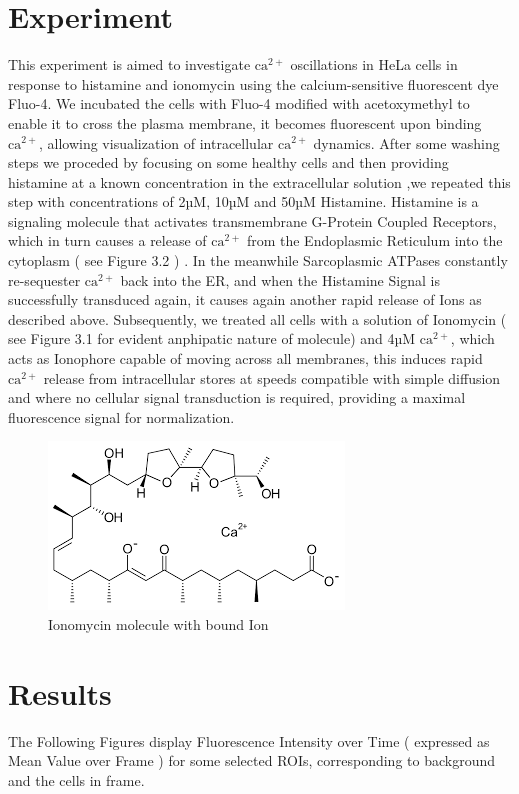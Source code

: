 \documentclass[a4paper,english,12pt,bibliography=totoc]{scrreprt}
\begin{document}
\section{Experiment}
This experiment is aimed to investigate $\mathrm{ca^{2+}}$ oscillations in HeLa cells in response to histamine and ionomycin using the calcium-sensitive fluorescent dye Fluo-4.\newline
We incubated the cells with Fluo-4 modified with acetoxymethyl to enable it to cross the plasma membrane, it becomes fluorescent upon binding $\mathrm{ca^{2+}}$, allowing visualization of intracellular $\mathrm{ca^{2+}}$ dynamics. After some washing steps we proceded by focusing on some healthy cells and then providing histamine at a known concentration in the extracellular solution ,we repeated this step with concentrations of 2µM, 10µM and 50µM Histamine.\newline
Histamine is a signaling molecule that activates transmembrane G-Protein Coupled Receptors, which in turn causes a release of $\mathrm{ca^{2+}}$ from the Endoplasmic Reticulum into the cytoplasm ( see Figure 3.2 ) . In the meanwhile Sarcoplasmic ATPases constantly re-sequester $\mathrm{ca^{2+}}$ back into the ER, and when the Histamine Signal is successfully transduced again, it causes again another rapid release of Ions as described above.\cite{lee_mechanisms_2001}\newline
Subsequently, we treated all cells with a solution of Ionomycin ( see Figure 3.1  for evident anphipatic nature of molecule) and 4µM $\mathrm{ca^{2+}}$, which acts as Ionophore capable of moving across all membranes, this induces rapid $\mathrm{ca^{2+}}$ release from intracellular stores at speeds compatible with simple diffusion and where no cellular signal transduction is required, providing a maximal fluorescence signal for normalization.
\begin{figure}[H]
    \centering
    \includegraphics[width=0.25\linewidth]{Images/Ionomycin.png}
    \caption{Ionomycin molecule with bound Ion}
    \label{fig:enter-label}
\end{figure}


\section{Results}
The Following Figures display Fluorescence Intensity over Time ( expressed as Mean Value over Frame ) for some selected ROIs, corresponding to background and the cells in frame.
\end{document}
